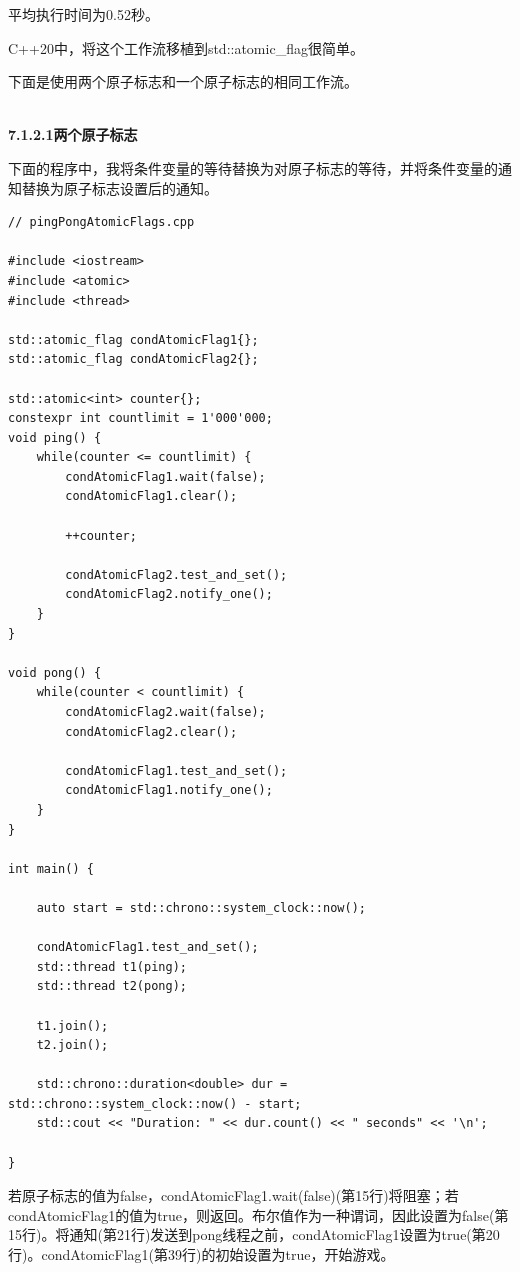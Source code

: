 平均执行时间为0.52秒。

C++20中，将这个工作流移植到std::atomic\_flag很简单。


下面是使用两个原子标志和一个原子标志的相同工作流。

\hspace*{\fill} \\ %
\noindent
\textbf{7.1.2.1\hspace{0.2cm}两个原子标志}

下面的程序中，我将条件变量的等待替换为对原子标志的等待，并将条件变量的通知替换为原子标志设置后的通知。

\begin{lstlisting}[style=styleCXX]
// pingPongAtomicFlags.cpp

#include <iostream>
#include <atomic>
#include <thread>

std::atomic_flag condAtomicFlag1{};
std::atomic_flag condAtomicFlag2{};

std::atomic<int> counter{};
constexpr int countlimit = 1'000'000;
void ping() {
	while(counter <= countlimit) {
		condAtomicFlag1.wait(false);
		condAtomicFlag1.clear();
		
		++counter;
		
		condAtomicFlag2.test_and_set();
		condAtomicFlag2.notify_one();
	}
}

void pong() {
	while(counter < countlimit) {
		condAtomicFlag2.wait(false);
		condAtomicFlag2.clear();
		
		condAtomicFlag1.test_and_set();
		condAtomicFlag1.notify_one();
	}
}

int main() {

	auto start = std::chrono::system_clock::now();
	
	condAtomicFlag1.test_and_set();
	std::thread t1(ping);
	std::thread t2(pong);
	
	t1.join();
	t2.join();
	
	std::chrono::duration<double> dur = std::chrono::system_clock::now() - start;
	std::cout << "Duration: " << dur.count() << " seconds" << '\n';

}
\end{lstlisting}

若原子标志的值为false，condAtomicFlag1.wait(false)(第15行)将阻塞；若condAtomicFlag1的值为true，则返回。布尔值作为一种谓词，因此设置为false(第15行)。将通知(第21行)发送到pong线程之前，condAtomicFlag1设置为true(第20行)。condAtomicFlag1(第39行)的初始设置为true，开始游戏。

